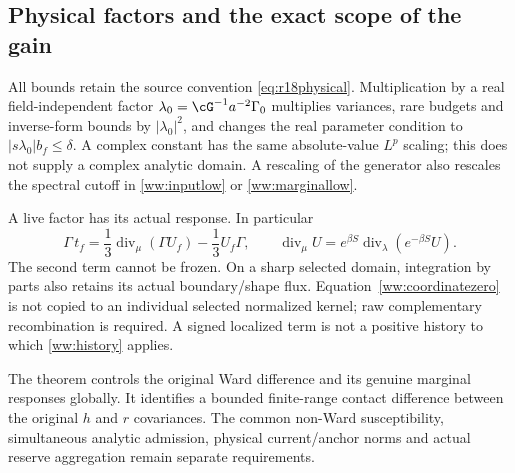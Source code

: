 \subsection{Physical factors and the exact scope of the gain}

All bounds retain the source convention \eqref{eq:r18physical}. Multiplication by a real field-independent factor $\lambda_0=\cG^{-1}a^{-2}\Gamma_0$ multiplies variances, rare budgets and inverse-form bounds by $|\lambda_0|^2$, and changes the real parameter condition to $|s\lambda_0|b_f\le\delta$. A complex constant has the same absolute-value $L^p$ scaling; this does not supply a complex analytic domain. A rescaling of the generator also rescales the spectral cutoff in \eqref{ww:inputlow} or \eqref{ww:marginallow}.

A live factor has its actual response. In particular
\[
 \Gamma\,t_f
 =\frac13\operatorname{div}_\mu(\Gamma U_f)
       -\frac13U_f\Gamma,
 \qquad
 \operatorname{div}_\mu U
 =e^{\beta S}\operatorname{div}_{\lambda}(e^{-\beta S}U).
\]
The second term cannot be frozen. On a sharp selected domain, integration by parts also retains its actual boundary/shape flux. Equation~\eqref{ww:coordinatezero} is not copied to an individual selected normalized kernel; raw complementary recombination is required. A signed localized term is not a positive history to which \eqref{ww:history} applies.

The theorem controls the original Ward difference and its genuine marginal responses globally. It identifies a bounded finite-range contact difference between the original $h$ and $r$ covariances. The common non-Ward susceptibility, simultaneous analytic admission, physical current/anchor norms and actual reserve aggregation remain separate requirements.
